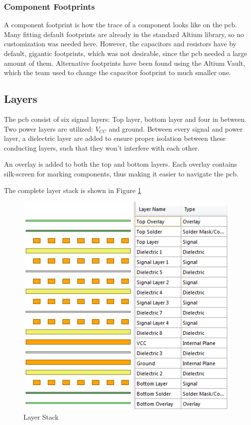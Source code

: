 \subsubsection{Component Footprints}
A component footprint is how the trace of a component looks like on the \gls{pcb}.
Many fitting default footprints are already in the standard Altium library, so no customization was needed here. 
However, the capacitors and resistors have by default, gigantic footprints, which was not desirable, since the \gls{pcb} needed a large amount of them.
Alternative footprints have been found using the Altium Vault, which the team used to change the capacitor footprint to much smaller one.

\subsection{Layers}
The \gls{pcb} consist of six signal layers: Top layer, bottom layer and four in between.
Two power layers are utilized: \(V_{CC}\) and ground.
Between every signal and power layer, a dielectric layer are added to ensure proper isolation between these conducting layers, such that they won't interfere with each other.

An overlay is added to both the top and bottom layers.
Each overlay contains silk-screen for marking components, thus making it easier to navigate the \gls{pcb}.

The complete layer stack is shown in Figure \ref{fig:Layers}

\begin{figure}[h!]
\centering
\includegraphics[scale = 0.8]{images/Layers.png}
\caption{Layer Stack}
\label{fig:Layers}
\end{figure}


